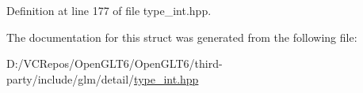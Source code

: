 Definition at line 177 of file type\+\_\+int.\+hpp.



The documentation for this struct was generated from the following file\+:\begin{DoxyCompactItemize}
\item 
D\+:/\+V\+C\+Repos/\+Open\+G\+L\+T6/\+Open\+G\+L\+T6/third-\/party/include/glm/detail/\mbox{\hyperlink{type__int_8hpp}{type\+\_\+int.\+hpp}}\end{DoxyCompactItemize}
